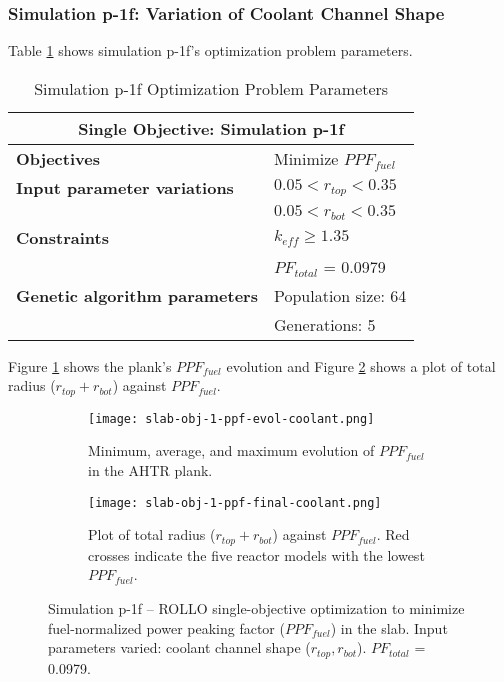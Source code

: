 \subsubsection{Simulation p-1f: Variation of Coolant Channel Shape}
Table \ref{tab:simulationp1f} shows simulation p-1f's optimization problem parameters. 
\begin{table}[htbp!]
    \centering
    \onehalfspacing
    \caption{Simulation p-1f Optimization Problem Parameters}
	\label{tab:simulationp1f}
    \footnotesize
    \begin{tabular}{l|p{3cm}}
    \hline 
    \multicolumn{2}{c}{\textbf{Single Objective: Simulation p-1f}} \\
    \hline 
    \textbf{Objectives} & Minimize $PPF_{fuel}$ \\
    \hline 
    \textbf{Input parameter variations} & $0.05<r_{top}<0.35$ \\
    & $0.05<r_{bot}<0.35$ \\
    \hline
    \textbf{Constraints} & $k_{eff} \geq 1.35$\\ 
    & $PF_{total}$ = 0.0979\\
    \hline 
    \textbf{Genetic algorithm parameters} & Population size: 64 \\
    & Generations: 5 \\
    \hline
    \end{tabular}
\end{table}

Figure \ref{fig:slab-obj-1-ppf-evol-coolant} shows the plank's $PPF_{fuel}$ evolution 
and Figure \ref{fig:slab-obj-1-ppf-final-coolant} shows a plot of total 
radius ($r_{top} + r_{bot}$) against $PPF_{fuel}$. 
\begin{figure}[htbp!]
    \centering
    \begin{subfigure}{\textwidth}
        \texttt{[image: slab-obj-1-ppf-evol-coolant.png]}
        \caption{Minimum, average, and maximum evolution of $PPF_{fuel}$ in the 
        AHTR plank.}
        \label{fig:slab-obj-1-ppf-evol-coolant} 
    \end{subfigure}
    \begin{subfigure}{\textwidth}
        \texttt{[image: slab-obj-1-ppf-final-coolant.png]}
        \caption{Plot of total radius ($r_{top} + r_{bot}$) against $PPF_{fuel}$. 
        Red crosses indicate the five reactor models with the lowest $PPF_{fuel}$.}
        \label{fig:slab-obj-1-ppf-final-coolant} 
    \end{subfigure}
    \caption{Simulation p-1f -- ROLLO single-objective optimization to minimize 
    fuel-normalized power peaking factor ($PPF_{fuel}$) in the slab. 
    Input parameters varied: coolant channel shape ($r_{top}, r_{bot}$). 
    $PF_{total}$ = 0.0979.}
    \label{fig:slab-obj-1-ppf-coolant}
\end{figure}

